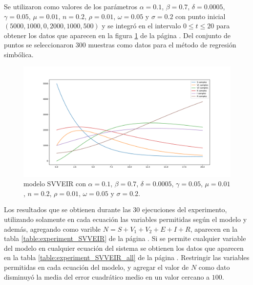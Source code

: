 Se utilizaron como valores de los parámetros $\alpha = 0.1$, $\beta = 0.7$, $\delta = 0.0005$, $\gamma = 0.05$, $\mu = 0.01$, $n = 0.2$, $\rho = 0.01$, $\omega = 0.05$ y $\sigma = 0.2$ con punto inicial $(5000, 1000, 0, 2000, 1000, 500)$ y se integró en el intervalo $0 \leq t \leq 20$ para obtener los datos que aparecen en la figura \ref{fig:SVVEIR} de la página \pageref{fig:SVVEIR}. Del conjunto de puntos se seleccionaron 300 muestras como datos para el método de regresión simbólica.

\begin{figure}[h]
    \centering
    \includegraphics[width=\textwidth]{"figures/SVVEIR.pdf"}
    \caption{modelo SVVEIR con $\alpha = 0.1$, $\beta = 0.7$, $\delta = 0.0005$, $\gamma = 0.05$, $\mu = 0.01$, $n = 0.2$, $\rho = 0.01$, $\omega = 0.05$ y $\sigma = 0.2$.}
    \label{fig:SVVEIR}
\end{figure}

Los resultados que se obtienen durante las 30 ejecuciones del experimento, utilizando solamente en cada ecuación las variables permitidas según el modelo y además, agregando como varible $N=S + V_1 + V_2 + E + I + R$, aparecen en la tabla \ref{table:experiment_SVVEIR} de la página \pageref{table:experiment_SVVEIR}. Si se permite cualquier variable del modelo en cualquier ecuación del sistema se obtienen los datos que aparecen en la tabla \ref{table:experiment_SVVEIR_all} de la página \pageref{table:experiment_SVVEIR_all}. Restringir las variables permitidas en cada ecuación del modelo, y agregar el valor de $N$ como dato disminuyó la media del error cuadrático medio en un valor cercano a $100$.

